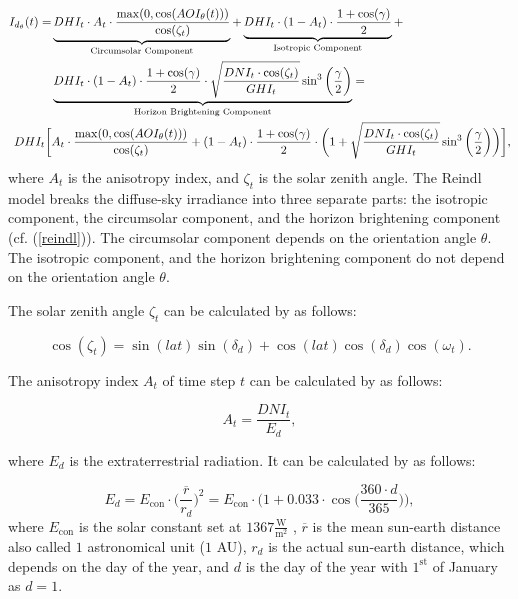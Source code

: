 \begin{align}\label{reindl}
I_{d_\theta}(t)=&\underbrace{DHI_t\cdot\vphantom{\sqrt(\frac{(X)^x_x}{(X)^x_x})}A_t\cdot \frac{\max(0,\cos(AOI_{\theta}(t)))}{\cos(\zeta_t)}}_{\text{Circumsolar Component}}+\underbrace{DHI_t\cdot(1-A_t)\cdot\frac{1+\cos(\gamma)}{2}}_{\text{Isotropic Component}}+\nonumber\\
&\underbrace{DHI_t\cdot(1-A_t)\cdot\frac{1+\cos(\gamma)}{2} \cdot\sqrt{\frac{DNI_t\cdot \cos(\zeta_t)}{GHI_t}}\sin^3\bigg(\frac{\gamma}{2}\bigg)}_{\text{Horizon Brightening Component}}=\nonumber\\
DHI_t\bigg[\vphantom{\sqrt(\frac{(X)^x_x}{(X)^x_x})}&A_t\cdot \frac{\max(0,\cos(AOI_{\theta}(t)))}{\cos(\zeta_t)}+(1-A_t)\cdot\frac{1+\cos(\gamma)}{2}\cdot\bigg(\vphantom{\sqrt(\frac{(X)^x_x}{(X)^x_x})}1+\sqrt{\frac{DNI_t\cdot \cos(\zeta_t)}{GHI_t}}\sin^3\bigg(\frac{\gamma}{2}\bigg)\bigg)\bigg],\nonumber\\
\end{align}
\normalsize
where $A_t$ is the anisotropy index, and $\zeta_t$ is the solar zenith angle. The Reindl model breaks the diffuse-sky irradiance into three separate parts: the isotropic component, the circumsolar component, and the horizon brightening component (cf. (\ref{reindl})). The circumsolar component depends on the orientation angle $\theta$. The isotropic component, and the horizon brightening component do not depend on the orientation angle $\theta$.



The solar zenith angle $\zeta_t$ can be calculated by \cite{zenith_angle} as follows:


\begin{equation}\label{zenith}
\cos(\zeta_t)=\sin(lat)\sin(\delta_d)+\cos(lat)\cos(\delta_d)\cos(\omega_t).
\end{equation}


The anisotropy index $A_t$ of time step $t$ can be calculated by \cite{reindl} as follows:


\begin{equation} \label{At}
A_t=\frac{DNI_t}{E_d},
\end{equation}

\noindent
where $E_d$ is the extraterrestrial radiation. It can be calculated by \cite{Ea} as follows:


\begin{equation}\label{extra}
E_d=E_{\mathrm{con}}\cdot \bigg(\frac{\overline{r}}{r_d}\bigg)^2=E_{\mathrm{con}}\cdot\bigg(1+0.033 \cdot \cos \bigg(\frac{360 \cdot d}{365}\bigg)\bigg),
\end{equation}
where $E_{\mathrm{con}}$ is the solar constant set at $1367 \frac{\mathrm{W}}{\mathrm{m}^2}$ \cite{Solar_Cell_declination_inclination_angle}, $\overline{r}$ is the mean sun-earth distance also called $1$ astronomical unit ($1$ AU), $r_d$ is the actual sun-earth distance, which depends on the day of the year, and $d$ is the day of the year with $1^{\mathrm{st}}$ of January as $d = 1$.




